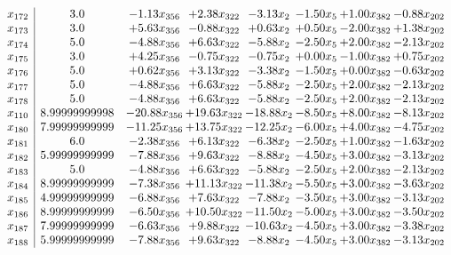 \documentclass[8pt]{article}
\begin{document}
\[\begin{array}{c| c c@{\hskip 2pt} c@{\hskip 2pt} c@{\hskip 2pt} c@{\hskip 2pt} c@{\hskip 2pt} c@{\hskip 2pt} }
 x_{172}   &  3.0 & -1.13 x_{356} & +  2.38 x_{322} & -3.13 x_{2} & -1.50 x_{5} & +  1.00 x_{382} & -0.88 x_{202}\\
 x_{173}   &  3.0 & +  5.63 x_{356} & -0.88 x_{322} & +  0.63 x_{2} & +  0.50 x_{5} & -2.00 x_{382} & +  1.38 x_{202}\\
 x_{174}   &  5.0 & -4.88 x_{356} & +  6.63 x_{322} & -5.88 x_{2} & -2.50 x_{5} & +  2.00 x_{382} & -2.13 x_{202}\\
 x_{175}   &  3.0 & +  4.25 x_{356} & -0.75 x_{322} & -0.75 x_{2} & +  0.00 x_{5} & -1.00 x_{382} & +  0.75 x_{202}\\
 x_{176}   &  5.0 & +  0.62 x_{356} & +  3.13 x_{322} & -3.38 x_{2} & -1.50 x_{5} & +  0.00 x_{382} & -0.63 x_{202}\\
 x_{177}   &  5.0 & -4.88 x_{356} & +  6.63 x_{322} & -5.88 x_{2} & -2.50 x_{5} & +  2.00 x_{382} & -2.13 x_{202}\\
 x_{178}   &  5.0 & -4.88 x_{356} & +  6.63 x_{322} & -5.88 x_{2} & -2.50 x_{5} & +  2.00 x_{382} & -2.13 x_{202}\\
 x_{110}   &  8.99999999998 & -20.88 x_{356} & + 19.63 x_{322} & -18.88 x_{2} & -8.50 x_{5} & +  8.00 x_{382} & -8.13 x_{202}\\
 x_{180}   &  7.99999999999 & -11.25 x_{356} & + 13.75 x_{322} & -12.25 x_{2} & -6.00 x_{5} & +  4.00 x_{382} & -4.75 x_{202}\\
 x_{181}   &  6.0 & -2.38 x_{356} & +  6.13 x_{322} & -6.38 x_{2} & -2.50 x_{5} & +  1.00 x_{382} & -1.63 x_{202}\\
 x_{182}   &  5.99999999999 & -7.88 x_{356} & +  9.63 x_{322} & -8.88 x_{2} & -4.50 x_{5} & +  3.00 x_{382} & -3.13 x_{202}\\
 x_{183}   &  5.0 & -4.88 x_{356} & +  6.63 x_{322} & -5.88 x_{2} & -2.50 x_{5} & +  2.00 x_{382} & -2.13 x_{202}\\
 x_{184}   &  8.99999999999 & -7.38 x_{356} & + 11.13 x_{322} & -11.38 x_{2} & -5.50 x_{5} & +  3.00 x_{382} & -3.63 x_{202}\\
 x_{185}   &  4.99999999999 & -6.88 x_{356} & +  7.63 x_{322} & -7.88 x_{2} & -3.50 x_{5} & +  3.00 x_{382} & -3.13 x_{202}\\
 x_{186}   &  8.99999999999 & -6.50 x_{356} & + 10.50 x_{322} & -11.50 x_{2} & -5.00 x_{5} & +  3.00 x_{382} & -3.50 x_{202}\\
 x_{187}   &  7.99999999999 & -6.63 x_{356} & +  9.88 x_{322} & -10.63 x_{2} & -4.50 x_{5} & +  3.00 x_{382} & -3.38 x_{202}\\
 x_{188}   &  5.99999999999 & -7.88 x_{356} & +  9.63 x_{322} & -8.88 x_{2} & -4.50 x_{5} & +  3.00 x_{382} & -3.13 x_{202}\\

\end{array}\]
\end{document}
